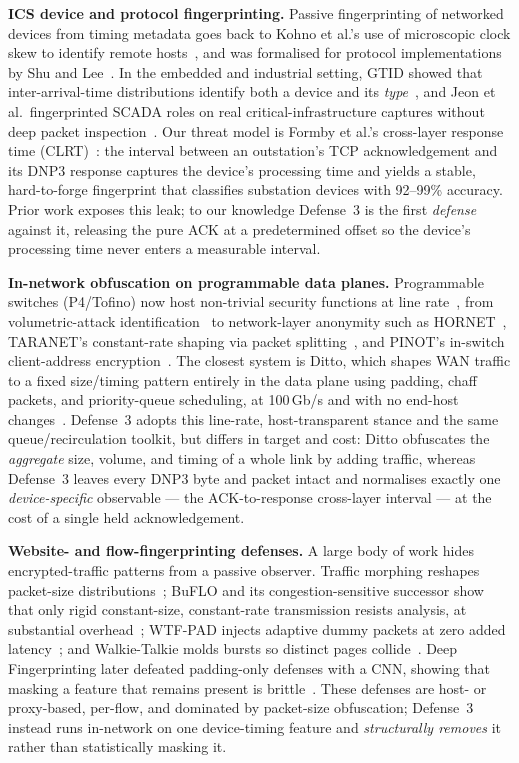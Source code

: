 \documentclass[10pt,a4paper,oneside]{article}
\begin{document}
\textbf{ICS device and protocol fingerprinting.} Passive fingerprinting of networked devices
from timing metadata goes back to Kohno et al.'s use of microscopic clock skew to identify remote
hosts~\cite{kohno2005remote}, and was formalised for protocol implementations by Shu and
Lee~\cite{shu2006fingerprint}. In the embedded and industrial setting, GTID showed that
inter-arrival-time distributions identify both a device and its
\emph{type}~\cite{radhakrishnan2014gtid}, and Jeon et al.\ fingerprinted SCADA roles on real
critical-infrastructure captures without deep packet inspection~\cite{jeon2016passive}. Our
threat model is Formby et al.'s cross-layer response time (CLRT)~\cite{formby2016control}: the
interval between an outstation's TCP acknowledgement and its DNP3 response captures the
device's processing time and yields a stable, hard-to-forge fingerprint that classifies
substation devices with 92--99\% accuracy. Prior work exposes this leak; to our knowledge
Defense~3 is the first \emph{defense} against it, releasing the pure ACK at a predetermined
offset so the device's processing time never enters a measurable interval.

\textbf{In-network obfuscation on programmable data planes.} Programmable switches (P4/Tofino)
now host non-trivial security functions at line rate~\cite{kfoury2021p4survey}, from
volumetric-attack identification~\cite{ding2021inddos} to network-layer anonymity such as
HORNET~\cite{chen2015hornet}, TARANET's constant-rate shaping via packet
splitting~\cite{chen2018taranet}, and PINOT's in-switch client-address
encryption~\cite{wang2020pinot}. The closest system is Ditto, which shapes WAN traffic to a
fixed size/timing pattern entirely in the data plane using padding, chaff packets, and
priority-queue scheduling, at 100\,Gb/s and with no end-host changes~\cite{meier2022ditto}.
Defense~3 adopts this line-rate, host-transparent stance and the same queue/recirculation
toolkit, but differs in target and cost: Ditto obfuscates the \emph{aggregate} size, volume,
and timing of a whole link by adding traffic, whereas Defense~3 leaves every DNP3 byte and
packet intact and normalises exactly one \emph{device-specific} observable --- the
ACK-to-response cross-layer interval --- at the cost of a single held acknowledgement.

\textbf{Website- and flow-fingerprinting defenses.} A large body of work hides
encrypted-traffic patterns from a passive observer. Traffic morphing reshapes packet-size
distributions~\cite{wright2009morphing}; BuFLO and its congestion-sensitive successor show
that only rigid constant-size, constant-rate transmission resists analysis, at substantial
overhead~\cite{dyer2012peekaboo,cai2014csbuflo}; WTF-PAD injects adaptive dummy packets at
zero added latency~\cite{juarez2016wtfpad}; and Walkie-Talkie molds bursts so distinct pages
collide~\cite{wang2017walkietalkie}. Deep Fingerprinting later defeated padding-only defenses
with a CNN, showing that masking a feature that remains present is
brittle~\cite{sirinam2018df}. These defenses are host- or proxy-based, per-flow, and dominated
by packet-size obfuscation; Defense~3 instead runs in-network on one device-timing feature and
\emph{structurally removes} it rather than statistically masking it.
\end{document}
